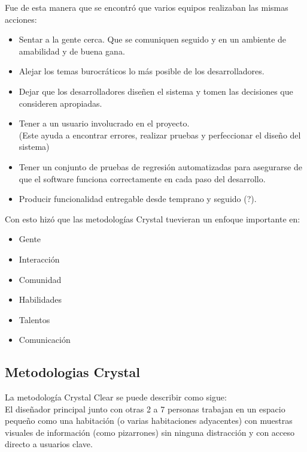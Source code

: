 \documentclass[12pt,a4paper]{article}
\begin{document}
	Fue de esta manera que se encontr\'o que varios equipos realizaban las mismas acciones:	
	\begin{itemize}
	\item Sentar a la gente cerca. Que se comuniquen seguido y en un ambiente de amabilidad y de buena gana.
	
	\item Alejar los temas burocr\'aticos lo m\'as posible de los desarrolladores.
	
 	\item Dejar que los desarrolladores dise\~nen el sistema y tomen las decisiones que consideren apropiadas.
	
	\item Tener a un usuario involucrado en el proyecto.\\
	(Este ayuda a encontrar errores, realizar pruebas y perfeccionar el dise\~no del sistema)
	
	\item Tener un conjunto de pruebas de regresi\'on automatizadas para asegurarse de que el software funciona correctamente en cada paso del desarrollo.
	
	\item Producir funcionalidad entregable desde temprano y seguido (?).
	\\
	\end{itemize}
	Con esto hiz\'o que las metodolog\'ias Crystal tuevieran un enfoque importante en:
	\begin{itemize}
		\item Gente 
		\item Interacci\'on
		\item Comunidad
		\item Habilidades
		\item Talentos
		\item Comunicaci\'on
	\end{itemize}
			
	\subsection*{Metodologias Crystal}		
	La metodolog\'ia Crystal Clear se puede describir como sigue:\\
	
	El dise\~nador principal junto con otras 2 a 7 personas trabajan en un espacio peque\~no como una habitaci\'on (o varias habitaciones adyacentes) con muestras visuales de informaci\'on (como pizarrones) sin ninguna distracci\'on y con acceso directo a usuarios clave.\\
	
\end{document}
